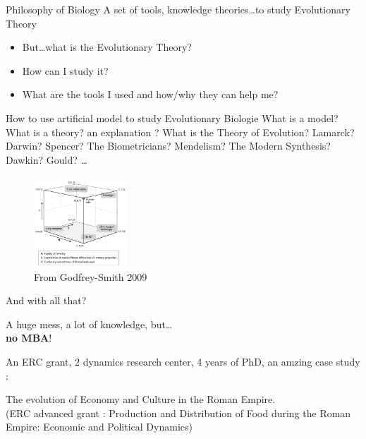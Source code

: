 \documentclass[8pt, handout=show,notes=show]{beamer}
\begin{document}
\begin{frame}{Philosophy of Biology}
	A set of tools, knowledge theories\ldots to study Evolutionary Theory
    \begin{itemize}
	\item But\ldots what is the Evolutionary Theory?
	\item How can I study it?
	\item What are the tools I used and how/why they can help me?
    \end{itemize}
    \vfill
    
    \begin{block}{How to use artificial model to study Evolutionary Biologie}
	 What is a model? What is a theory? an explanation ? What is the Theory of Evolution? Lamarck? Darwin? Spencer? The Biometricians? Mendelism? The Modern Synthesis? Dawkin? Gould? \ldots 
    \end{block}

    \begin{figure}
	\includegraphics[width=3.5cm]{images/darwinianspace.png}
	\caption{From Godfrey-Smith 2009}
    \end{figure}

    
\end{frame}


\begin{frame}{And with all that?}

    \begin{center}
	\huge
	A huge mess, a lot of knowledge, but\ldots\\  \textbf{no MBA}!
    \end{center}


    
\end{frame}
\begin{frame}
    An ERC grant, 2 dynamics research center, 4 years of PhD, an amzing case study :
    \vfill

    \begin{center}
	\huge
	The evolution of Economy and Culture in the Roman Empire.\\
	\vfill
	\small
	(ERC advanced grant : Production and Distribution of Food during the Roman Empire: Economic and Political Dynamics)
    \end{center}
\end{frame}
\end{document}
